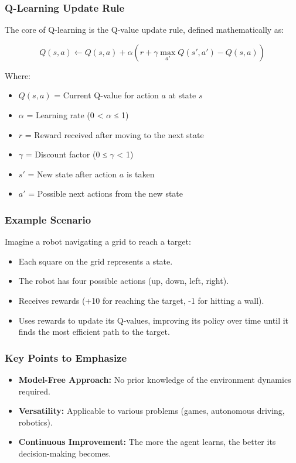 \documentclass{beamer}
\begin{document}
\begin{frame}[fragile]
    \frametitle{Q-Learning Update Rule}
    The core of Q-learning is the Q-value update rule, defined mathematically as:

    \begin{equation}
        Q(s, a) \leftarrow Q(s, a) + \alpha \left( r + \gamma \max_{a'} Q(s', a') - Q(s, a) \right)
    \end{equation}
    
    Where:
    \begin{itemize}
        \item \( Q(s, a) \) = Current Q-value for action \( a \) at state \( s \)
        \item \( \alpha \) = Learning rate (0 < \( \alpha \) ≤ 1)
        \item \( r \) = Reward received after moving to the next state
        \item \( \gamma \) = Discount factor (0 ≤ \( \gamma \) < 1)
        \item \( s' \) = New state after action \( a \) is taken
        \item \( a' \) = Possible next actions from the new state
    \end{itemize}
\end{frame}

\begin{frame}[fragile]
    \frametitle{Example Scenario}
    Imagine a robot navigating a grid to reach a target:
    
    \begin{itemize}
        \item Each square on the grid represents a state.
        \item The robot has four possible actions (up, down, left, right).
        \item Receives rewards (+10 for reaching the target, -1 for hitting a wall).
        \item Uses rewards to update its Q-values, improving its policy over time until it finds the most efficient path to the target.
    \end{itemize}
\end{frame}

\begin{frame}[fragile]
    \frametitle{Key Points to Emphasize}
    \begin{itemize}
        \item \textbf{Model-Free Approach:} No prior knowledge of the environment dynamics required.
        \item \textbf{Versatility:} Applicable to various problems (games, autonomous driving, robotics).
        \item \textbf{Continuous Improvement:} The more the agent learns, the better its decision-making becomes.
    \end{itemize}
\end{frame}
\end{document}
